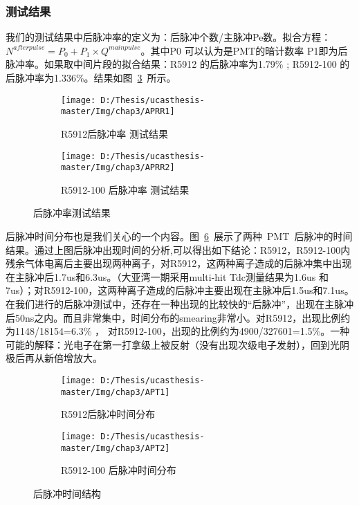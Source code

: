 \subsubsection{测试结果}
我们的测试结果中后脉冲率的定义为：后脉冲个数/主脉冲Pe数。拟合方程：$N^{afterpulse} = P_0 +P_1\times Q^{mainpulse}$。其中P0 可以认为是PMT的暗计数率  P1即为后脉冲率。如果取中间片段的拟合结果：R5912 的后脉冲率为1.79\% ; R5912-100 的后脉冲率为1.336\%。结果如图~\ref{fig:APRR}~所示。
\begin{figure}[!htbp]
  \centering
  \begin{subfigure}[b]{\MySubFactor\textwidth}
    \texttt{[image: D:/Thesis/ucasthesis-master/Img/chap3/APRR1]}
    \caption{R5912后脉冲率 测试结果}
    \label{fig:APRR_1}
  \end{subfigure}%
  \quad\quad\quad\quad%
  \begin{subfigure}[b]{\MySubFactor\textwidth}
    \texttt{[image: D:/Thesis/ucasthesis-master/Img/chap3/APRR2]}
    \caption{R5912-100 后脉冲率 测试结果}
    \label{fig:APRR_2}
  \end{subfigure}
  \caption{后脉冲率测试结果}
  \label{fig:APRR}
\end{figure}


后脉冲时间分布也是我们关心的一个内容。图~\ref{fig:APT}~展示了两种~PMT~后脉冲的时间结果。通过上图后脉冲出现时间的分析,可以得出如下结论：R5912，R5912-100内残余气体电离后主要出现两种离子，对R5912，这两种离子造成的后脉冲集中出现在主脉冲后1.7us和6.3us。（大亚湾一期采用multi-hit Tdc测量结果为1.6us 和 7us）；对R5912-100，这两种离子造成的后脉冲主要出现在主脉冲后1.5us和7.1us。在我们进行的后脉冲测试中，还存在一种出现的比较快的“后脉冲”，出现在主脉冲后50ns之内。而且非常集中，时间分布的smearing非常小。对R5912，出现比例约为1148/18154=6.3\% ，  对R5912-100，出现的比例约为4900/327601=1.5\%。一种可能的解释：光电子在第一打拿级上被反射（没有出现次级电子发射），回到光阴极后再从新倍增放大。


\begin{figure}[!htbp]
  \centering
  \begin{subfigure}[b]{\MySubFactor\textwidth}
    \texttt{[image: D:/Thesis/ucasthesis-master/Img/chap3/APT1]}
    \caption{R5912后脉冲时间分布}
    \label{fig:APT_1}
  \end{subfigure}%
  \quad\quad\quad\quad%
  \begin{subfigure}[b]{\MySubFactor\textwidth}
    \texttt{[image: D:/Thesis/ucasthesis-master/Img/chap3/APT2]}
    \caption{R5912-100 后脉冲时间分布}
    \label{fig:APT_2}
  \end{subfigure}
  \caption{后脉冲时间结构}
  \label{fig:APT}
\end{figure}




